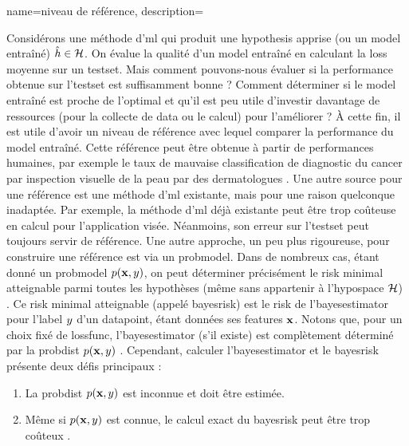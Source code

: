 {name={niveau de référence},
	description={Considérons une méthode d'\gls{ml} qui produit une \gls{hypothesis} apprise 
		(ou un \gls{model} entraîné) $\hat{h} \in \mathcal{H}$. On évalue la qualité d’un \gls{model} entraîné 
		en calculant la \gls{loss} moyenne sur un \gls{testset}. Mais comment pouvons-nous évaluer 
		si la performance obtenue sur l'\gls{testset} est suffisamment bonne ? Comment 
		déterminer si le \gls{model} entraîné est proche de l’optimal et qu’il est peu utile 
		d’investir davantage de ressources (pour la collecte de \gls{data} ou le calcul) pour l’améliorer ? 
		À cette fin, il est utile d’avoir un niveau de référence avec lequel 
		comparer la performance du \gls{model} entraîné. Cette référence 
		peut être obtenue à partir de performances humaines, par exemple le taux de mauvaise classification de diagnostic du cancer par inspection visuelle de la peau par des dermatologues \cite{SkinHumanAI}. Une autre source pour une référence est une méthode d'\gls{ml} existante, 
		mais pour une raison quelconque inadaptée. Par exemple, la méthode d'\gls{ml} déjà existante 
		peut être trop coûteuse en calcul pour l’application visée. 
		Néanmoins, son erreur sur l'\gls{testset} peut toujours servir de référence. Une autre approche, un peu plus rigoureuse, 
		pour construire une référence est via un \gls{probmodel}. Dans de nombreux cas, étant donné un \gls{probmodel} $p({\bf x},y)$,  
		on peut déterminer précisément le \gls{risk} minimal atteignable parmi toutes les hypothèses
		(même sans appartenir à l’\gls{hypospace} $\mathcal{H}$) \cite{LC}. 
		Ce \gls{risk} minimal atteignable (appelé \gls{bayesrisk}) est le \gls{risk} 
		de l’\gls{bayesestimator} pour l’\gls{label} $y$ d’un \gls{datapoint}, étant données 
		ses \glspl{feature} ${\bf x}$. Notons que, pour un choix fixé de \gls{lossfunc}, l’\gls{bayesestimator} 
		(s’il existe) est complètement déterminé par la \gls{probdist} $p({\bf x},y)$ \cite[Ch. 4]{LC}. 
		Cependant, calculer l’\gls{bayesestimator} et le \gls{bayesrisk} présente deux 
		défis principaux :
		\begin{enumerate}[label=\arabic*)]
			\item La \gls{probdist} $p({\bf x},y)$ est inconnue et 
			doit être estimée.
			\item Même si $p({\bf x},y)$ est connue, 
			le calcul exact du \gls{bayesrisk} peut être trop coûteux \cite{cooper1990computational}. 
		\end{enumerate}
}}
